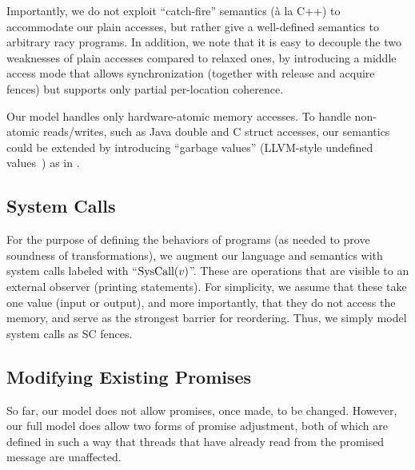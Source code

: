 Importantly, we do not exploit ``catch-fire'' semantics (\`a la C++) to accommodate our plain accesses,
but rather give a well-defined semantics to arbitrary racy programs.
In addition, we note that it is easy to decouple the two weaknesses of plain accesses compared to relaxed ones,
by introducing a middle access mode that allows synchronization
(together with release and acquire fences) but supports only partial per-location coherence.  

\begin{remark}
Our model handles only hardware-atomic memory accesses.
To handle non-atomic reads/writes, such as Java double and C struct accesses, our semantics could be extended 
by introducing ``garbage values'' (LLVM-style undefined values~\cite{llvm}) as in \cite{Soham17}.
\end{remark}

\subsection{System Calls}
\label{sec:sys_call}
For the purpose of  defining the behaviors of programs (as needed to prove soundness of transformations),
we augment our language and semantics with system calls labeled with ``${\text{SysCall}(v)}$''.
These are operations that  are visible to an external observer (\eg printing statements). 
For simplicity, we assume that these take one value (input or output),
and more importantly, that they do not access the memory, and serve as the strongest barrier for reordering.
Thus, we simply model system calls as SC fences.

\subsection{Modifying Existing Promises}

So far, our model does not allow promises, once made, to be changed.
However, our full model does allow two forms of promise adjustment,
both of which are defined in such a way that threads that have already
read from the promised message are unaffected.


